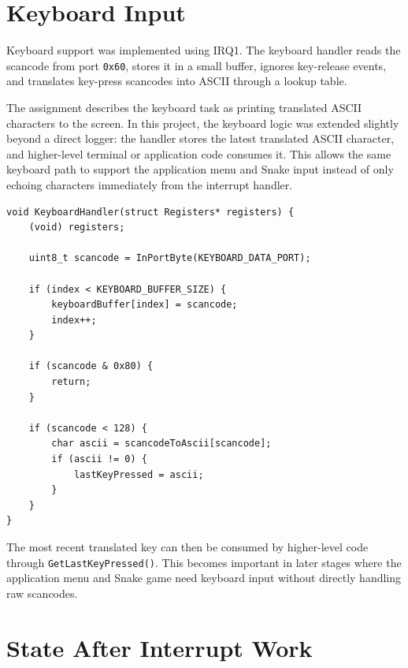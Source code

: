 \section{Keyboard Input}

Keyboard support was implemented using IRQ1. The keyboard handler reads the scancode from port \texttt{0x60}, stores it in a small buffer, ignores key-release events, and translates key-press scancodes into ASCII through a lookup table.

The assignment describes the keyboard task as printing translated ASCII characters to the screen. In this project, the keyboard logic was extended slightly beyond a direct logger: the handler stores the latest translated ASCII character, and higher-level terminal or application code consumes it. This allows the same keyboard path to support the application menu and Snake input instead of only echoing characters immediately from the interrupt handler.

\begin{listing}[H]
\begin{verbatim}
void KeyboardHandler(struct Registers* registers) {
    (void) registers;

    uint8_t scancode = InPortByte(KEYBOARD_DATA_PORT);

    if (index < KEYBOARD_BUFFER_SIZE) {
        keyboardBuffer[index] = scancode;
        index++;
    }

    if (scancode & 0x80) {
        return;
    }

    if (scancode < 128) {
        char ascii = scancodeToAscii[scancode];
        if (ascii != 0) {
            lastKeyPressed = ascii;
        }
    }
}
\end{verbatim}
\caption{Keyboard IRQ handler reading scancodes and storing the latest ASCII key.}
\end{listing}

The most recent translated key can then be consumed by higher-level code through \texttt{GetLastKeyPressed()}. This becomes important in later stages where the application menu and Snake game need keyboard input without directly handling raw scancodes.

\section{State After Interrupt Work}

